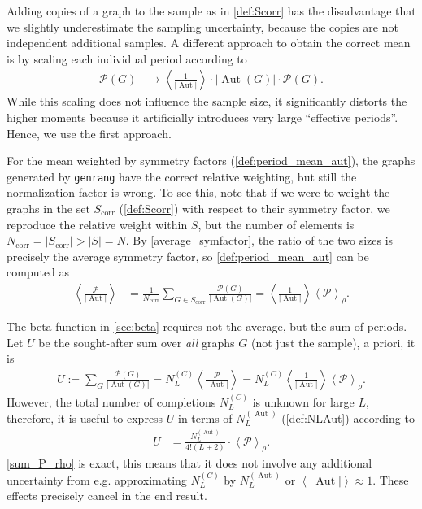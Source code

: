 \documentclass[11pt,a4paper]{article}
\newcommand{\abs}[1]{\lvert #1 \rvert}
\newcommand{\period}{\mathcal P}
\newcommand{\Aut}{\operatorname{Aut}}
\renewcommand{\|}{\rule[-0.4ex]{0.2ex}{1.2em}}
\begin{document}
Adding copies of a graph to the sample as in \cref{def:Scorr} has the disadvantage that we slightly underestimate the sampling uncertainty, because the copies are not independent additional samples. 
A different approach to obtain the correct mean is   by scaling each individual period according to
\begin{align}\label{period_sampling_rescaling}
	\period(G)&\mapsto\left \langle \frac{1}{\abs{\Aut}} \right \rangle \cdot  \abs{\Aut(G)} \cdot \period (G) . 
\end{align}
While this scaling does not influence the sample size, it significantly distorts the higher moments  because it artificially introduces very large \enquote{effective periods}. Hence, we use the first approach.

For the mean weighted by symmetry factors (\cref{def:period_mean_aut}), the graphs generated by \texttt{genrang} have the correct relative weighting, but still the normalization factor is wrong. To see this, note that if we were to weight the graphs in the set  $S_\text{corr}$ (\cref{def:Scorr}) with respect to their symmetry factor, we reproduce  the relative weight within $S$, but the number of elements is $N_\text{corr}=\abs{S_\text{corr}}>\abs{S}=N$. By \cref{average_symfactor}, the ratio of the two sizes is precisely the average symmetry factor, so   \cref{def:period_mean_aut} can be computed as
\begin{align*}
\left \langle \frac{\period}{\abs{\Aut}} \right \rangle &= \frac{1}{N_\text{corr}}\sum_{G\in S_\text{corr}} \frac{\period(G)}{\abs{\Aut(G)}} = \left \langle \frac{1}{\abs{\Aut}} \right \rangle  \left \langle \period \right \rangle _\rho.
\end{align*}


The beta function in \cref{sec:beta} requires not the average, but the sum of periods. Let $U$ be the sought-after sum over \emph{all} graphs $G$ (not just the sample), a priori, it is 
\begin{align*}
U :=\sum_G \frac{\period(G)}{\abs{\Aut(G)}} = N^{(C)}_L \left \langle \frac{\period}{\abs{\Aut}} \right \rangle  =  N^{(C)}_L\left \langle \frac{1}{\abs{\Aut}} \right \rangle \left \langle \period \right \rangle _\rho.
\end{align*}
However, the total number of completions $N^{(C)}_L$ is unknown for large $L$, therefore, it is useful to express $U$ in terms of $N^{(\Aut)}_L$ (\cref{def:NLAut}) according to 
\begin{align}\label{sum_P_rho}
U &=  \frac{N^{(\Aut)}_L}{4!(L+2)} \cdot \left \langle \period \right \rangle _\rho. 
\end{align}
\cref{sum_P_rho} is exact, this means that it does not involve any additional uncertainty from e.g. approximating $N^{(C)}_L$ by $N^{(\Aut)}_L$ or $\left \langle \abs{\Aut} \right \rangle \approx 1$. These effects precisely cancel in the end result. 
\end{document}
